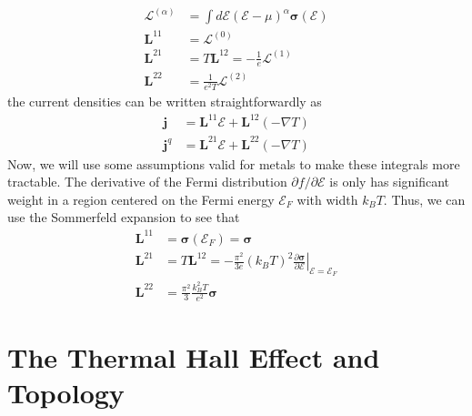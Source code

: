 \documentclass{thesis-umich}
\begin{document}
\begin{align*} \mathcal{L}^{(\alpha)} &= \int d\mathcal{E} (\mathcal{E} - \mu)^\alpha
\mathbf{\sigma}(\mathcal{E}) \\
	\mathbf{L}^{11} &= \mathcal{L}^{(0)} \\
	\mathbf{L}^{21} &= T \mathbf{L}^{12} = -\frac{1}{e}\mathcal{L}^{(1)} \\
	\mathbf{L}^{22} &= \frac{1}{e^2T} \mathcal{L}^{(2)}
\end{align*}
the current densities can be written straightforwardly as
\begin{align*}
	\mathbf{j} &= \mathbf{L}^{11}\mathbf{\mathcal{E}} +
	\mathbf{L}^{12}(-\nabla T) \\
	\mathbf{j}^q &= \mathbf{L}^{21}\mathbf{\mathcal{E}} +
	\mathbf{L}^{22}(-\nabla T)
\end{align*}
Now, we will use some assumptions valid for metals to make these integrals more
tractable. The derivative of the Fermi distribution $\partial f / \partial
\mathcal{E}$ is only has significant weight in a region centered on the Fermi energy
$\mathcal{E}_F$ with width $k_BT$. Thus, we can use the Sommerfeld expansion to
see that
\begin{align*}
	\mathbf{L}^{11} &= \mathbf{\sigma}(\mathcal{E}_F) = \mathbf{\sigma} \\
	\mathbf{L}^{21} &= T\mathbf{L}^{12} = -\frac{\pi^2}{3e}(k_BT)^2
	\left.\frac{\partial \mathbf{\sigma}}{\partial
		\mathcal{E}}\right|_{\mathcal{E} = \mathcal{E}_F} \\
	\mathbf{L}^{22} &= \frac{\pi^2}{3} \frac{k_B^2T}{e^2}\mathbf{\sigma}
\end{align*}
\section{The Thermal Hall Effect and Topology}
\end{document}

